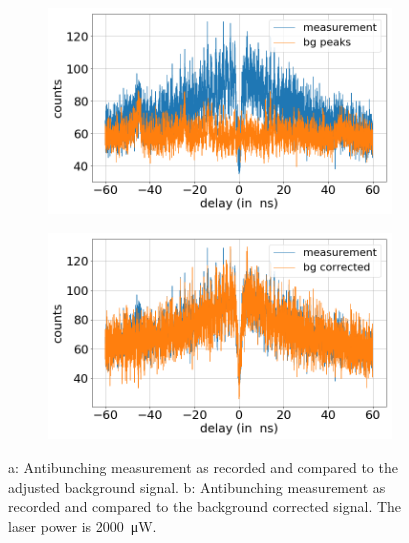 \begin{figure}[!ht]
    \centering
    \begin{subfigure}{0.47\textwidth}
        \centering
        \includegraphics[width=1.0\textwidth]{img/output_t2/2000.0muW_bg_peaks.png}
    \caption{}
    \end{subfigure}
    \begin{subfigure}{0.47\textwidth}
        \centering
        \includegraphics[width=\textwidth]{img/output_t2/2000.0muW_bg_vgl.png}
        \caption{}
    \end{subfigure}
    \caption{a: Antibunching measurement as recorded and compared to the adjusted background signal. b: Antibunching measurement as recorded and compared to the background corrected signal. The laser power is \SI{2000}{\micro W}.} %
\end{figure}

\newpage
